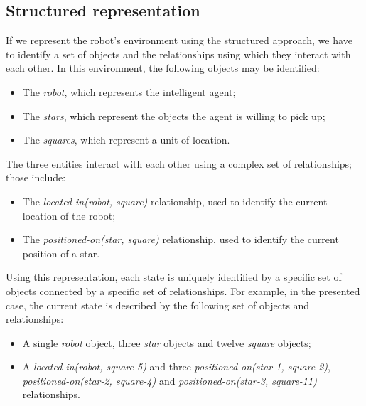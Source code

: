 \documentclass[letterpaper,headings=standardclasses]{scrartcl}
\begin{document}
\subsection{Structured representation}

If we represent the robot’s environment using the structured approach, we have to identify a set of objects and the relationships using which they interact with each other. In this environment, the following objects may be identified:

\begin{itemize}

\item The \emph{robot}, which represents the intelligent agent;

\item The \emph{stars}, which represent the objects the agent is willing to pick up;

\item The \emph{squares}, which represent a unit of location.

\end{itemize}

The three entities interact with each other using a complex set of relationships; those include:

\begin{itemize}

\item The \emph{located-in(robot, square)} relationship, used to identify the current location of the robot;

\item The \emph{positioned-on(star, square)} relationship, used to identify the current position of a star.

\end{itemize}

Using this representation, each state is uniquely identified by a specific set of objects connected by a specific set of relationships. For example, in the presented case, the current state is described by the following set of objects and relationships:

\begin{itemize}

\item A single \emph{robot} object, three \emph{star} objects and twelve \emph{square} objects;
\item A \emph{located-in(robot, square-5)} and three \emph{positioned-on(star-1, square-2)}, \emph{positioned-on(star-2, square-4)} and \emph{positioned-on(star-3, square-11)} relationships.

\end{itemize}
\end{document}
